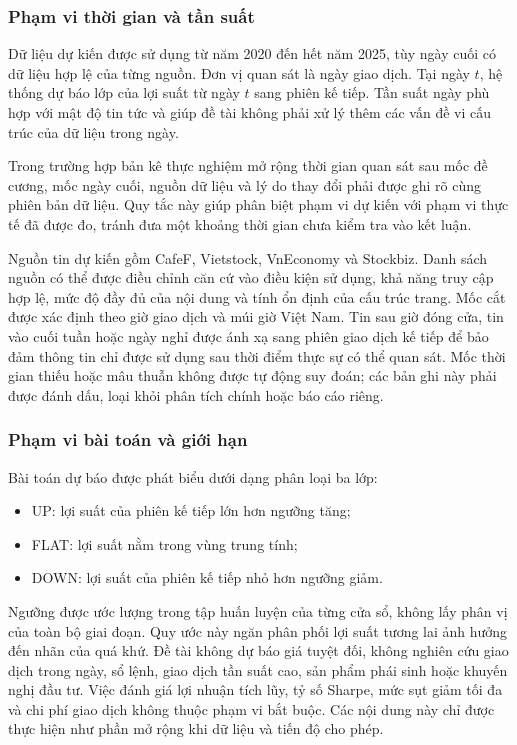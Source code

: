 \subsubsection{Phạm vi thời gian và tần suất}

Dữ liệu dự kiến được sử dụng từ năm 2020 đến hết năm 2025, tùy ngày cuối có dữ liệu hợp
lệ của từng nguồn. Đơn vị quan sát là ngày giao dịch. Tại ngày $t$, hệ thống dự báo lớp
của lợi suất từ ngày $t$ sang phiên kế tiếp. Tần suất ngày phù hợp với mật độ tin tức
và giúp đề tài không phải xử lý thêm các vấn đề vi cấu trúc của dữ liệu trong ngày.

Trong trường hợp bản kê thực nghiệm mở rộng thời gian quan sát sau mốc đề cương,
mốc ngày cuối, nguồn dữ liệu và lý do thay đổi phải được ghi rõ cùng phiên bản dữ liệu.
Quy tắc này giúp phân biệt phạm vi dự kiến với phạm vi thực tế đã được đo, tránh đưa
một khoảng thời gian chưa kiểm tra vào kết luận.

Nguồn tin dự kiến gồm CafeF, Vietstock, VnEconomy và Stockbiz. Danh sách nguồn có thể
được điều chỉnh căn cứ vào điều kiện sử dụng, khả năng truy cập hợp lệ, mức độ đầy đủ
của nội dung và tính ổn định của cấu trúc trang. Mốc cắt được xác định theo giờ giao
dịch và múi giờ Việt Nam. Tin sau giờ đóng cửa, tin vào cuối tuần hoặc ngày nghỉ được
ánh xạ sang phiên giao dịch kế tiếp để bảo đảm thông tin chỉ được sử dụng sau thời điểm
thực sự có thể quan sát. Mốc thời gian thiếu hoặc mâu thuẫn không được tự động suy đoán;
các bản ghi này phải được đánh dấu, loại khỏi phân tích chính hoặc báo cáo riêng.

\subsubsection{Phạm vi bài toán và giới hạn}

Bài toán dự báo được phát biểu dưới dạng phân loại ba lớp:

\begin{itemize}[nosep]
  \item UP: lợi suất của phiên kế tiếp lớn hơn ngưỡng tăng;
  \item FLAT: lợi suất nằm trong vùng trung tính;
  \item DOWN: lợi suất của phiên kế tiếp nhỏ hơn ngưỡng giảm.
\end{itemize}

Ngưỡng được ước lượng trong tập huấn luyện của từng cửa sổ, không lấy phân vị của toàn
bộ giai đoạn. Quy ước này ngăn phân phối lợi suất tương lai ảnh hưởng đến nhãn của quá
khứ. Đề tài không dự báo giá tuyệt đối, không nghiên cứu giao dịch trong ngày, sổ lệnh,
giao dịch tần suất cao, sản phẩm phái sinh hoặc khuyến nghị đầu tư. Việc đánh giá lợi
nhuận tích lũy, tỷ số Sharpe, mức sụt giảm tối đa và chi phí giao dịch không thuộc phạm
vi bắt buộc. Các nội dung này chỉ được thực hiện như phần mở rộng khi dữ liệu và tiến
độ cho phép.


